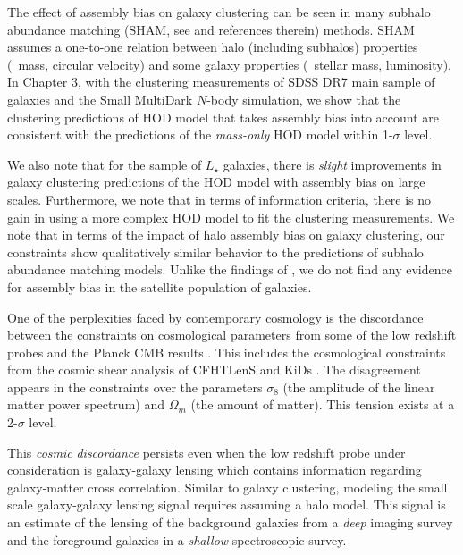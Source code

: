The effect of assembly bias on galaxy clustering can be seen in many subhalo abundance matching (SHAM, see \citealt{hearin2014,lehman2015} and references therein) methods. SHAM assumes a one-to-one relation between halo (including subhalos) properties (\eg\ mass, circular velocity) and some galaxy properties (\eg\ stellar mass, luminosity). In Chapter 3, with the clustering measurements of SDSS DR7 main sample of galaxies \citep{abazajian2009} and the Small MultiDark $N$-body simulation, we show that the clustering predictions of \citep{decorated} HOD model that takes assembly bias into account are consistent with the predictions of the \emph{mass-only} HOD model within 1-$\sigma$ level. 

We also note that for the sample of $L_{\star}$ galaxies, there is \emph{slight} improvements in galaxy clustering predictions of the HOD model with assembly bias 
on large scales. Furthermore, we note that in terms of information criteria, there is no gain in using a more complex HOD model to fit the clustering measurements.
We note that in terms of the impact of halo assembly bias on galaxy clustering, our constraints show qualitatively similar behavior to the predictions of subhalo abundance matching models. Unlike the findings of \citet{zentner2016}, we do not find any evidence for assembly bias in the satellite population of galaxies.

One of the perplexities faced by contemporary cosmology is the discordance between the constraints on cosmological parameters from some of the low redshift probes and 
the Planck CMB results \citep{planckII}. This includes the cosmological constraints from the cosmic shear analysis of CFHTLenS \citep{heymans,kitching2016} and KiDs \citep{hildebrandt2017}. The disagreement appears in the constraints over the parameters $\sigma_{8}$ (the amplitude of the linear matter power spectrum) and $\Omega_{m}$ (the amount of matter). This tension exists at a 2-$\sigma$ level. 

This \emph{cosmic} \emph{discordance} persists even when the low redshift probe under consideration is galaxy-galaxy lensing which contains information regarding galaxy-matter cross correlation. Similar to galaxy clustering, modeling the small scale galaxy-galaxy lensing signal requires assuming a halo model. 
This signal is an estimate of the lensing of the background galaxies from a \emph{deep} imaging survey and the foreground galaxies in a \emph{shallow} spectroscopic survey.

